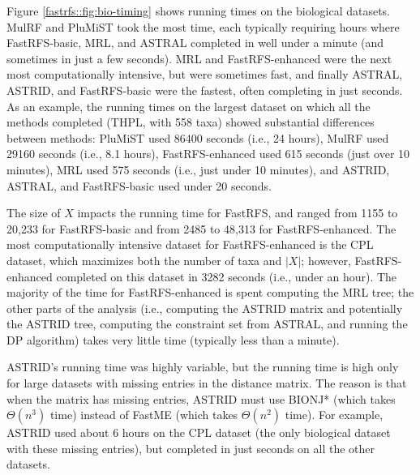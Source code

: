 Figure \ref{fastrfs::fig:bio-timing} 
shows running times on the biological datasets.
MulRF and PluMiST took the most time,
 each typically requiring
hours where FastRFS-basic, MRL, and ASTRAL completed in 
well under a minute (and sometimes in just a few seconds).
MRL and FastRFS-enhanced were the next most computationally 
intensive, but were
sometimes
fast, and finally 
ASTRAL, ASTRID, and FastRFS-basic were the fastest,
often completing in just seconds. 
As an example, 
the running times on the largest dataset on which
all the methods completed
(THPL, with 558 taxa) showed substantial
differences between methods:
PluMiST used 86400 seconds (i.e., 24 hours), MulRF
used 29160 seconds (i.e., 8.1 hours), 
FastRFS-enhanced used 615 seconds (just over 10 minutes), 
MRL used 575 seconds (i.e., just under 10 minutes),
and ASTRID, ASTRAL, and FastRFS-basic used under 20 seconds.

The size of $X$ impacts the running time for FastRFS, and
ranged from 1155 to 
20,233 for FastRFS-basic
and from 2485 to 48,313 for FastRFS-enhanced.
The most computationally intensive dataset
for FastRFS-enhanced is the CPL dataset, which maximizes
both the number of taxa and $|X|$; 
however, FastRFS-enhanced
completed on this dataset in 
3282 seconds (i.e., 
under an hour).
The majority of the time for FastRFS-enhanced is spent
computing the MRL tree; the other parts of the analysis 
(i.e., computing the ASTRID matrix and potentially the ASTRID
tree, computing the constraint set from ASTRAL, and running the DP
algorithm) takes very little time (typically less than a minute).


ASTRID's running time was highly variable,
but the running time is high only for
large datasets with missing entries in the
distance matrix. The reason is
that when the matrix has missing entries, ASTRID must use BIONJ*
(which takes $\Theta(n^3)$ time)
instead of FastME (which takes $\Theta(n^2)$ time).
For example, ASTRID used about 6 hours
on the CPL dataset (the only biological
dataset with these missing entries), 
but completed in just seconds on all the other
datasets. %


















